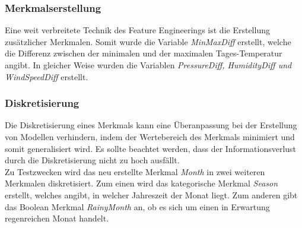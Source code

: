 \subsubsection{Merkmalserstellung}
Eine weit verbreitete Technik des Feature Engineerings ist die Erstellung zusätzlicher Merkmalen. Somit wurde die Variable \emph{MinMaxDiff} erstellt, welche die Differenz zwischen der minimalen und der maximalen Tages-Temperatur angibt. In gleicher Weise wurden die Variablen \emph{PressureDiff, HumidityDiff und WindSpeedDiff} erstellt.

\subsubsection{Diskretisierung}
Die Diskretisierung eines Merkmals kann eine Überanpassung bei der Erstellung von Modellen verhindern, indem der Wertebereich des Merkmals minimiert und somit generalisiert wird. Es sollte beachtet werden, dass der Informationsverlust durch die Diskretisierung nicht zu hoch ausfällt.\\
\noindent \hspace*{7mm}
Zu Testzwecken wird das neu erstellte Merkmal \emph{Month} in zwei weiteren Merkmalen diskretisiert. Zum einen wird das kategorische Merkmal \emph{Season} erstellt, welches angibt,  in welcher Jahreszeit der Monat liegt. Zum anderen gibt das Boolean Merkmal \emph{RainyMonth} an, ob es sich um einen in Erwartung regenreichen Monat handelt.

